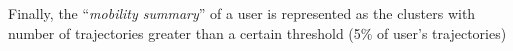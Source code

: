 Finally, the ``\emph{mobility summary}'' of a user is represented as the clusters with number of trajectories greater than a certain threshold (5\% of user's trajectories)%

%
%
